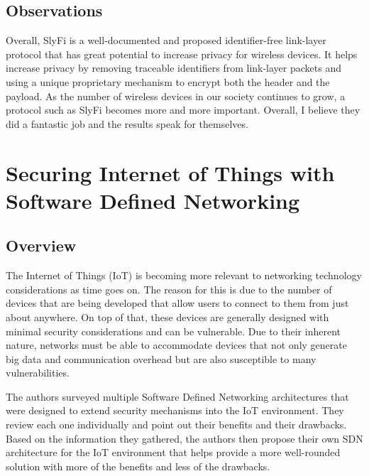 \subsection {Observations}

Overall, SlyFi is a well-documented and proposed identifier-free link-layer protocol that has great potential to increase privacy for wireless devices. It helps increase privacy by removing traceable identifiers from link-layer packets and using a unique proprietary mechanism to encrypt both the header and the payload. As the number of wireless devices in our society continues to grow, a protocol such as SlyFi becomes more and more important. Overall, I believe they did a fantastic job and the results speak for themselves.



\section {Securing Internet of Things with Software Defined Networking}
\subsection {Overview}

The Internet of Things (IoT) is becoming more relevant to networking technology considerations as time goes on. The reason for this is due to the number of devices that are being developed that allow users to connect to them from just about anywhere. On top of that, these devices are generally designed with minimal security considerations and can be vulnerable. Due to their inherent nature, networks must be able to accommodate devices that not only generate big data and communication overhead but are also susceptible to many vulnerabilities. 

\smallskip

The authors surveyed multiple Software Defined Networking architectures that were designed to extend security mechanisms into the IoT environment. They review each one individually and point out their benefits and their drawbacks. Based on the information they gathered, the authors then propose their own SDN architecture for the IoT environment that helps provide a more well-rounded solution with more of the benefits and less of the drawbacks.

\smallskip

